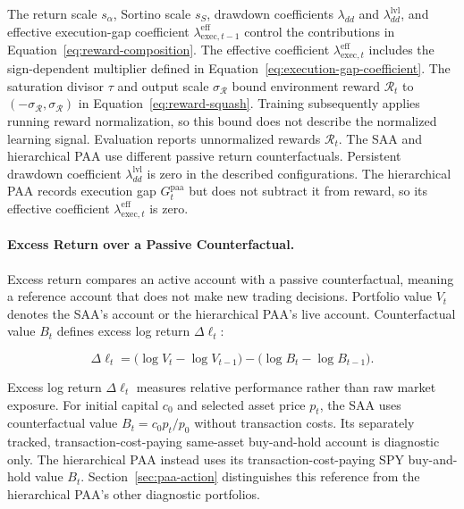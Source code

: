 The return scale \(s_\alpha\), Sortino scale \(s_S\), drawdown coefficients \(\lambda_{dd}\) and \(\lambda_{dd}^{\mathrm{lvl}}\), and effective execution-gap coefficient \(\lambda_{\mathrm{exec},t-1}^{\mathrm{eff}}\) control the contributions in Equation~\eqref{eq:reward-composition}. The effective coefficient \(\lambda_{\mathrm{exec},t}^{\mathrm{eff}}\) includes the sign-dependent multiplier defined in Equation~\eqref{eq:execution-gap-coefficient}. The saturation divisor \(\tau\) and output scale \(\sigma_{\mathcal R}\) bound environment reward \(\mathcal R_t\) to \((-\sigma_{\mathcal R},\sigma_{\mathcal R})\) in Equation~\eqref{eq:reward-squash}. Training subsequently applies running reward normalization, so this bound does not describe the normalized learning signal. Evaluation reports unnormalized rewards \(\mathcal R_t\). The SAA and hierarchical PAA use different passive return counterfactuals. Persistent drawdown coefficient \(\lambda_{dd}^{\mathrm{lvl}}\) is zero in the described configurations. The hierarchical PAA records execution gap \(G_t^{\mathrm{paa}}\) but does not subtract it from reward, so its effective coefficient \(\lambda_{\mathrm{exec},t}^{\mathrm{eff}}\) is zero.

\paragraph{Excess Return over a Passive Counterfactual.}
\label{sec:excess-return}

Excess return compares an active account with a passive counterfactual, meaning a reference account that does not make new trading decisions. Portfolio value \(V_t\) denotes the SAA's account or the hierarchical PAA's live account. Counterfactual value \(B_t\) defines excess log return \(\Delta\ell_t\):

\begin{equation}
\Delta\ell_t = \big(\log V_t - \log V_{t-1}\big) - \big(\log B_t - \log B_{t-1}\big).
\label{eq:reward-excess}
\end{equation}

Excess log return \(\Delta\ell_t\) measures relative performance rather than raw market exposure. For initial capital \(c_0\) and selected asset price \(p_t\), the SAA uses counterfactual value \(B_t=c_0p_t/p_0\) without transaction costs. Its separately tracked, transaction-cost-paying same-asset buy-and-hold account is diagnostic only. The hierarchical PAA instead uses its transaction-cost-paying SPY buy-and-hold value \(B_t\). Section~\ref{sec:paa-action} distinguishes this reference from the hierarchical PAA's other diagnostic portfolios.

